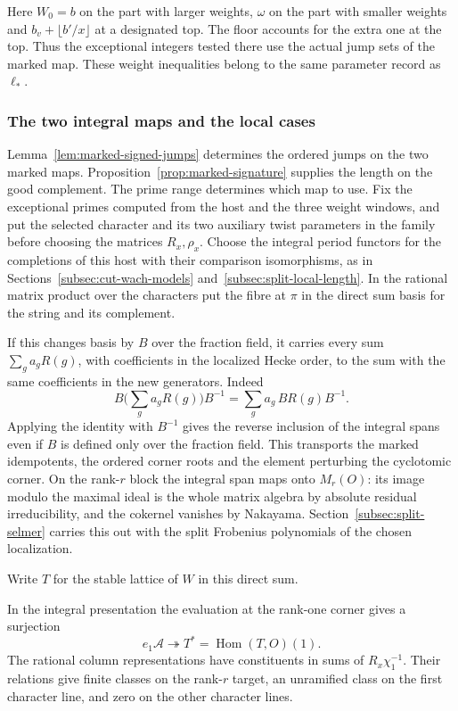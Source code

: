Here \(W_0=b\) on the part with larger weights, \(\omega\) on the part with smaller weights and \(b_v+\lfloor b'/x\rfloor\) at a designated top.
The floor accounts for the extra one at the top. Thus the
exceptional integers tested there use the actual jump sets of
the marked map. These weight inequalities belong to the same
parameter record as \(\ell_*\).
\label{cor:marked-localization-6}

\subsubsection*{The two integral maps and the local cases}

Lemma~\ref{lem:marked-signed-jumps} determines the ordered jumps on the two marked maps. Proposition~\ref{prop:marked-signature} supplies the length on the good complement. The prime range determines which map to use.
Fix the exceptional primes computed from the host and the
three weight windows, and put the selected character and its
two auxiliary twist parameters in the family before choosing
the matrices \(R_x,\rho_x\). Choose the integral period functors
for the completions of this host with their comparison
isomorphisms, as in Sections~\ref{subsec:cut-wach-models}
and~\ref{subsec:split-local-length}.  In the rational matrix product
over the characters put the fibre at \(\pi\) in the direct
sum basis for the string and its complement.

If this changes
basis by \(B\) over the fraction field, it carries every sum
\(\sum_g a_g R(g)\), with coefficients in the localized
Hecke order, to the sum with the same coefficients in the new
generators. Indeed
\[
 B\Big(\sum_g a_gR(g)\Big)B^{-1}
      =\sum_g a_g\,BR(g)B^{-1}.
\]
Applying the identity with \(B^{-1}\) gives the reverse inclusion of
the integral spans even if \(B\) is defined only over the fraction field. This transports the marked
idempotents, the ordered corner roots and the element
perturbing the cyclotomic corner. On the rank-\(r\) block
the integral span maps onto \(M_r(O)\): its image modulo the
maximal ideal is the whole matrix algebra by absolute residual
irreducibility, and the cokernel vanishes by Nakayama.
Section~\ref{subsec:split-selmer} carries this out with the
split Frobenius polynomials of the chosen localization.

Write \(T\) for the stable lattice of \(W\) in this direct sum.

\begin{lemma}
\label{lem:marked-row-column-lattices}
In the integral presentation the evaluation at the rank-one corner gives a surjection
\[
 e_1\mathcal A\twoheadrightarrow T^*=\operatorname{Hom}(T,O)(1).
\] The rational column
representations have constituents in sums of \(R_x\chi_1^{-1}\).
Their relations give finite classes on the rank-\(r\) target,
an unramified class on the first character line, and zero on
the other character lines.
\end{lemma}

